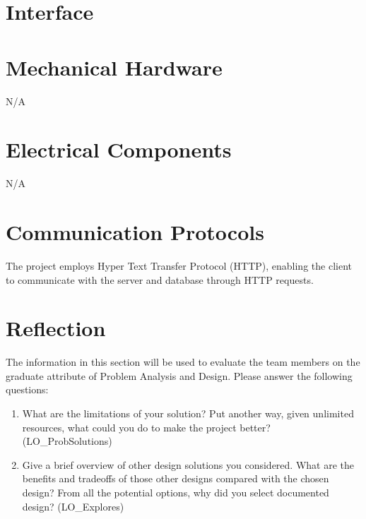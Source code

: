 \documentclass[12pt, titlepage]{article}
\begin{document}
	\newpage{}
	
	\appendix
	
	\section{Interface}
	
	
	\section{Mechanical Hardware}
	N/A
	
	\section{Electrical Components}
	N/A
	
	\section{Communication Protocols}
	The project employs Hyper Text Transfer Protocol (HTTP), enabling the client to communicate with the server and database through HTTP requests.
	
	\section{Reflection}
	
	The information in this section will be used to evaluate the team members on the
	graduate attribute of Problem Analysis and Design.  Please answer the following questions:
	
	\begin{enumerate}
		\item What are the limitations of your solution?  Put another way, given
		unlimited resources, what could you do to make the project better? (LO\_ProbSolutions)
		\item Give a brief overview of other design solutions you considered.  What
		are the benefits and tradeoffs of those other designs compared with the chosen
		design?  From all the potential options, why did you select documented design?
		(LO\_Explores)
	\end{enumerate}
	
\end{document}
